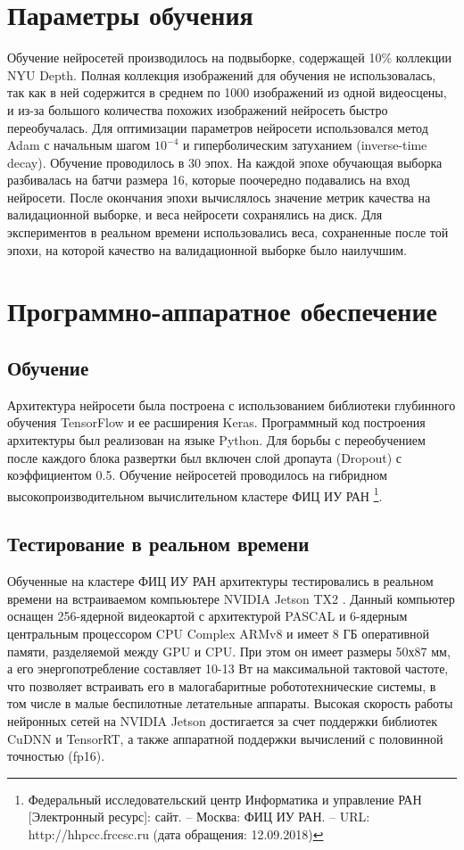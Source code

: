 \documentclass{mipt-thesis-bs}
\begin{document}
\section{Параметры обучения}
Обучение нейросетей производилось на подвыборке, содержащей 10\% коллекции NYU Depth. Полная коллекция изображений для обучения не использовалась, так как в ней содержится в среднем по 1000 изображений из одной видеосцены, и из-за большого количества похожих изображений нейросеть быстро переобучалась. Для оптимизации параметров нейросети использовался метод Adam \cite{kingma2014adam} с начальным шагом $10^{-4}$ и гиперболическим затуханием (inverse-time decay). Обучение проводилось в 30 эпох. На каждой эпохе обучающая выборка разбивалась на батчи размера 16, которые поочередно подавались на вход нейросети. После окончания эпохи вычислялось значение метрик качества на валидационной выборке, и веса нейросети сохранялись на диск. Для экспериментов в реальном времени использовались веса, сохраненные после той эпохи, на которой качество на валидационной выборке было наилучшим.
 
\section{Программно-аппаратное обеспечение}

\subsection{Обучение}
Архитектура нейросети была построена с использованием библиотеки глубинного обучения TensorFlow и ее расширения Keras. Программный код построения архитектуры был реализован на языке Python. Для борьбы с переобучением  после каждого блока развертки был включен слой дропаута (Dropout) с коэффициентом 0.5. 
Обучение нейросетей проводилось на гибридном высокопроизводительном вычислительном кластере ФИЦ ИУ РАН \footnote{Федеральный исследовательский центр Информатика и управление РАН [Электронный ресурс]: сайт. – Москва: ФИЦ ИУ РАН. – URL: http://hhpcc.frccsc.ru (дата обращения: 12.09.2018)}.

\subsection{Тестирование в реальном времени}
Обученные на кластере ФИЦ ИУ РАН архитектуры тестировались в реальном времени на встраиваемом компьюьтере NVIDIA Jetson TX2 \cite{franklin2017nvidia}. Данный компьютер оснащен 256-ядерной видеокартой с архитектурой PASCAL и 6-ядерным центральным процессором CPU Complex ARMv8 и имеет 8 ГБ оперативной памяти, разделяемой между GPU и CPU. При этом он имеет размеры 50х87 мм, а его энергопотребление составляет 10-13 Вт на максимальной тактовой частоте, что позволяет встраивать его в малогабаритные робототехнические системы, в том числе в малые беспилотные летательные аппараты. Высокая скорость работы нейронных сетей на NVIDIA Jetson достигается за счет поддержки библиотек CuDNN и TensorRT, а также аппаратной поддержки вычислений с половинной точностью (fp16).
\end{document}
